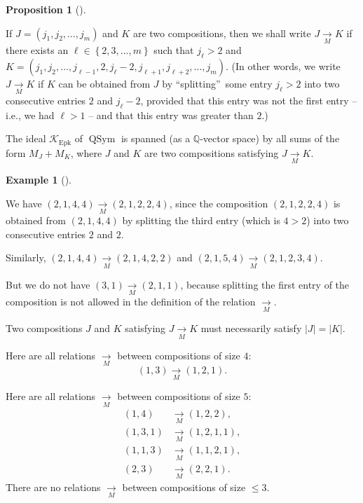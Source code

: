 \documentclass[numbers=enddot,12pt,final,onecolumn,notitlepage]{scrartcl}%
\theoremstyle{definition}
\newtheorem{prop}[theo]{Proposition}
\newenvironment{proposition}[1][]
{\begin{prop}[#1]\begin{leftbar}}
{\end{leftbar}\end{prop}}
\newtheorem{exmp}[theo]{Example}
\newenvironment{example}[1][]
{\begin{exmp}[#1]\begin{leftbar}}
{\end{leftbar}\end{exmp}}
\begin{document}
\begin{proposition}
\label{prop.K.Epk.M}If $J=\left(  j_{1},j_{2},\ldots,j_{m}\right)  $ and $K$
are two compositions, then we shall write $J\underset{M}{\rightarrow}K$ if
there exists an $\ell\in\left\{  2,3,\ldots,m\right\}  $ such that $j_{\ell
}>2$ and $K=\left(  j_{1},j_{2},\ldots,j_{\ell-1},2,j_{\ell}-2,j_{\ell
+1},j_{\ell+2},\ldots,j_{m}\right)  $. (In other words, we write
$J\underset{M}{\rightarrow}K$ if $K$ can be obtained from $J$ by
\textquotedblleft splitting\textquotedblright\ some entry $j_{\ell}>2$ into
two consecutive entries $2$ and $j_{\ell}-2$, provided that this entry was not
the first entry -- i.e., we had $\ell>1$ -- and that this entry was greater
than $2$.)

The ideal $\mathcal{K}_{\operatorname*{Epk}}$ of $\operatorname*{QSym}$ is
spanned (as a $\mathbb{Q}$-vector space) by all sums of the form $M_{J}+M_{K}%
$, where $J$ and $K$ are two compositions satisfying
$J\underset{M}{\rightarrow}K$.
\end{proposition}

\begin{example}
We have $\left(  2,1,4,4\right)  \underset{M}{\rightarrow}\left(
2,1,2,2,4\right)  $, since the composition $\left(  2,1,2,2,4\right)  $ is
obtained from $\left(  2,1,4,4\right)  $ by splitting the third entry (which
is $4>2$) into two consecutive entries $2$ and $2$.

Similarly, $\left(  2,1,4,4\right)  \underset{M}{\rightarrow}\left(
2,1,4,2,2\right)  $ and $\left(  2,1,5,4\right)  \underset{M}{\rightarrow
}\left(  2,1,2,3,4\right)  $.

But we do not have $\left(  3,1\right)  \underset{M}{\rightarrow}\left(
2,1,1\right)  $, because splitting the first entry of the composition is not
allowed in the definition of the relation $\underset{M}{\rightarrow}$.

Two compositions $J$ and $K$ satisfying $J\underset{M}{\rightarrow}K$ must
necessarily satisfy $\left\vert J\right\vert =\left\vert K\right\vert $.

Here are all relations $\underset{M}{\rightarrow}$ between compositions of
size $4$:%
\[
\left(  1,3\right)  \underset{M}{\rightarrow}\left(  1,2,1\right)  .
\]


Here are all relations $\underset{M}{\rightarrow}$ between compositions of
size $5$:%
\begin{align*}
\left(  1,4\right)   &  \underset{M}{\rightarrow}\left(  1,2,2\right)  ,\\
\left(  1,3,1\right)   &  \underset{M}{\rightarrow}\left(  1,2,1,1\right)  ,\\
\left(  1,1,3\right)   &  \underset{M}{\rightarrow}\left(  1,1,2,1\right)  ,\\
\left(  2,3\right)   &  \underset{M}{\rightarrow}\left(  2,2,1\right)  .
\end{align*}
There are no relations $\underset{M}{\rightarrow}$ between compositions of
size $\leq3$.
\end{example}
\end{document}
